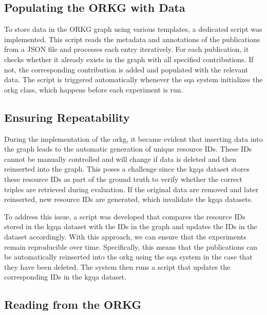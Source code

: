 \subsection{Populating the ORKG with Data}
\label{sec:populating_the_orkg}

To store data in the ORKG graph using various templates, a dedicated script was implemented. This script reads the metadata and annotations of the publications from a JSON file and processes each entry iteratively. For each publication, it checks whether it already exists in the graph with all specified contributions. If not, the corresponding contribution is added and populated with the relevant data. The script is triggered automatically whenever the \gls{sqa} system initializes the \gls{orkg} class, which happens before each experiment is run. 

\subsection{Ensuring Repeatability}
\label{sec:orkg_ensuring_repeatability}

During the implementation of the \gls{orkg}, it became evident that inserting data into the graph leads to the automatic generation of unique resource IDs. These IDs cannot be manually controlled and will change if data is deleted and then reinserted into the graph. This poses a challenge since the \gls{kgqa} dataset stores these resource IDs as part of the ground truth to verify whether the correct triples are retrieved during evaluation. If the original data are removed and later reinserted, new resource IDs are generated, which invalidate the \gls{kgqa} datasets.

To address this issue, a script was developed that compares the resource IDs stored in the \gls{kgqa} dataset with the IDs in the graph and updates the IDs in the dataset accordingly. With this approach, we can ensure that the experiments remain reproducible over time. Specifically, this means that the publications can be automatically reinserted into the \gls{orkg} using the \gls{sqa} system in the case that they have been deleted. The system then runs a script that updates the corresponding IDs in the \gls{kgqa} dataset.


\subsection{Reading from the ORKG}
\label{sec:reading_from_the_orkg}


